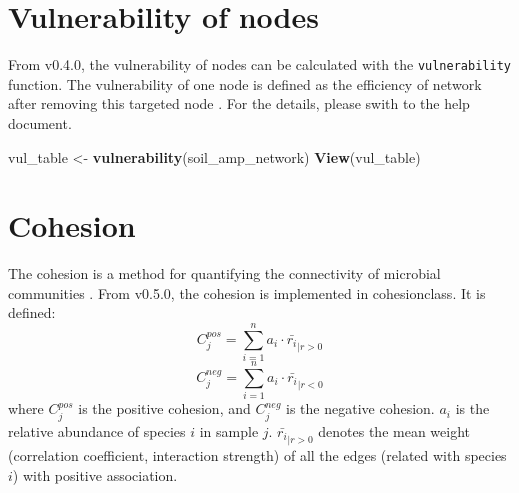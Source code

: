 \documentclass[
]{book}
\newenvironment{Shaded}{\begin{snugshade}}{\end{snugshade}}
\newcommand{\AttributeTok}[1]{\textcolor[rgb]{0.13,0.29,0.53}{#1}}
\newcommand{\CommentTok}[1]{\textcolor[rgb]{0.56,0.35,0.01}{\textit{#1}}}
\newcommand{\FunctionTok}[1]{\textcolor[rgb]{0.13,0.29,0.53}{\textbf{#1}}}
\newcommand{\NormalTok}[1]{#1}
\newcommand{\OtherTok}[1]{\textcolor[rgb]{0.56,0.35,0.01}{#1}}
\newcommand{\SpecialCharTok}[1]{\textcolor[rgb]{0.81,0.36,0.00}{\textbf{#1}}}
\newcommand{\StringTok}[1]{\textcolor[rgb]{0.31,0.60,0.02}{#1}}
\begin{document}
\section{Vulnerability of nodes}\label{vulnerability-of-nodes}

From v0.4.0, the vulnerability of nodes can be calculated with the \texttt{vulnerability} function.
The vulnerability of one node is defined as the efficiency of network after removing this targeted node \citep{Yuan_Climatewarm_2021}.
For the details, please swith to the help document.

\begin{Shaded}
\begin{Highlighting}[]
\NormalTok{vul\_table }\OtherTok{\textless{}{-}} \FunctionTok{vulnerability}\NormalTok{(soil\_amp\_network)}
\FunctionTok{View}\NormalTok{(vul\_table)}
\end{Highlighting}
\end{Shaded}

\section{Cohesion}\label{cohesion}

The cohesion is a method for quantifying the connectivity of microbial communities \citep{Herren_Cohesion_2017}.
From v0.5.0, the cohesion is implemented in cohesionclass.
It is defined:
\[   C_{j}^{pos} = \sum_{i=1}^{n} a_{i} \cdot \bar{r_{i}}_{|r>0}   \]
\[   C_{j}^{neg} = \sum_{i=1}^{n} a_{i} \cdot \bar{r_{i}}_{|r<0}   \]
where \(C_{j}^{pos}\) is the positive cohesion, and \(C_{j}^{neg}\) is the negative cohesion.
\(a_{i}\) is the relative abundance of species \(i\) in sample \(j\).
\(\bar{r_{i}}_{|r>0}\) denotes the mean weight (correlation coefficient, interaction strength) of all the edges (related with species \(i\)) with positive association.

\begin{Shaded}
\end{Shaded}
\end{document}
